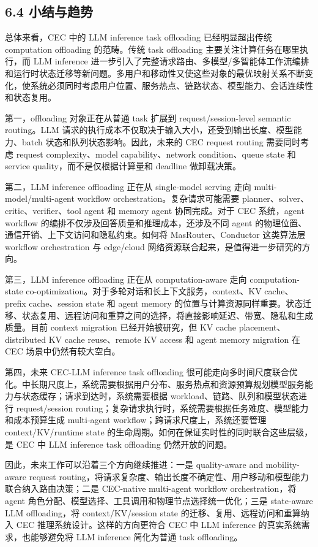 \documentclass[a4paper,twocolumn,10pt]{ctexart}
\begin{document}
\subsection{6.4 小结与趋势}

总体来看，CEC 中的 LLM inference task offloading 已经明显超出传统 computation offloading 的范畴。传统 task offloading 主要关注计算任务在哪里执行，而 LLM inference 进一步引入了完整请求路由、多模型/多智能体工作流编排和运行时状态迁移等新问题。多用户和移动性又使这些对象的最优映射关系不断变化，使系统必须同时考虑用户位置、服务热点、链路状态、模型能力、会话连续性和状态复用。


第一，offloading 对象正在从普通 task 扩展到 request/session-level semantic routing。LLM 请求的执行成本不仅取决于输入大小，还受到输出长度、模型能力、batch 状态和队列状态影响。因此，未来的 CEC request routing 需要同时考虑 request complexity、model capability、network condition、queue state 和 service quality，而不是仅根据计算量和 deadline 做卸载决策。


第二，LLM inference offloading 正在从 single-model serving 走向 multi-model/multi-agent workflow orchestration。复杂请求可能需要 planner、solver、critic、verifier、tool agent 和 memory agent 协同完成。对于 CEC 系统，agent workflow 的编排不仅涉及回答质量和推理成本，还涉及不同 agent 的物理位置、通信开销、上下文访问和隐私约束。如何将 MasRouter、Conductor 这类算法层 workflow orchestration 与 edge/cloud 网络资源联合起来，是值得进一步研究的方向。


第三，LLM inference offloading 正在从 computation-aware 走向 computation-state co-optimization。对于多轮对话和长上下文服务，context、KV cache、prefix cache、session state 和 agent memory 的位置与计算资源同样重要。状态迁移、状态复用、远程访问和重算之间的选择，将直接影响延迟、带宽、隐私和生成质量。目前 context migration 已经开始被研究，但 KV cache placement、distributed KV cache reuse、remote KV access 和 agent memory migration 在 CEC 场景中仍然有较大空白。


第四，未来 CEC-LLM inference task offloading 很可能走向多时间尺度联合优化。中长期尺度上，系统需要根据用户分布、服务热点和资源预算规划模型服务能力与状态缓存；请求到达时，系统需要根据 workload、链路、队列和模型状态进行 request/session routing；复杂请求执行时，系统需要根据任务难度、模型能力和成本预算生成 multi-agent workflow；跨请求尺度上，系统还要管理 context/KV/runtime state 的生命周期。如何在保证实时性的同时联合这些层级，是 CEC 中 LLM inference task offloading 仍然开放的问题。


因此，未来工作可以沿着三个方向继续推进：一是 quality-aware and mobility-aware request routing，将请求复杂度、输出长度不确定性、用户移动和模型能力联合纳入路由决策；二是 CEC-native multi-agent workflow orchestration，将 agent 角色分配、模型选择、工具调用和物理节点选择统一优化；三是 state-aware LLM offloading，将 context/KV/session state 的迁移、复用、远程访问和重算纳入 CEC 推理系统设计。这样的方向更符合 CEC 中 LLM inference 的真实系统需求，也能够避免将 LLM inference 简化为普通 task offloading。
\end{document}
